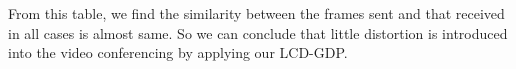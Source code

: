From this table, we find the similarity between the frames sent and
that received in all cases is almost same. So we can conclude that
little distortion is introduced into the video conferencing by
applying our LCD-GDP. 
 


  


